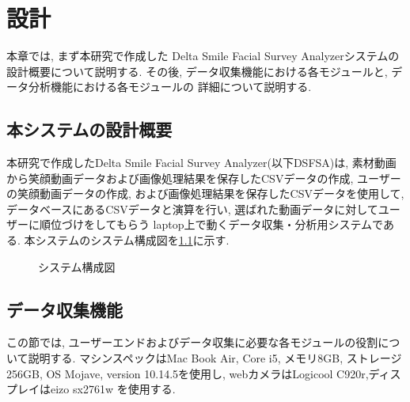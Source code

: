 \chapter{設計}
\label{chap:function}

本章では, まず本研究で作成した Delta Smile Facial Survey Analyzerシステムの
設計概要について説明する.
その後, データ収集機能における各モジュールと, データ分析機能における各モジュールの
詳細について説明する.

\section{本システムの設計概要}
本研究で作成したDelta Smile Facial Survey Analyzer(以下DSFSA)は,
素材動画から笑顔動画データおよび画像処理結果を保存したCSVデータの作成,
ユーザーの笑顔動画データの作成, および画像処理結果を保存したCSVデータを使用して,
データベースにあるCSVデータと演算を行い, 選ばれた動画データに対してユーザーに順位づけをしてもらう
laptop上で動くデータ収集・分析用システムである.
本システムのシステム構成図を\ref{fig:system_architecture}に示す.

\begin{figure}[htbp]
    \begin{center}
    \end{center}
    \caption{システム構成図}
    \label{fig:system_architecture}
\end{figure}

\section{データ収集機能}
この節では, ユーザーエンドおよびデータ収集に必要な各モジュールの役割について説明する.
マシンスペックはMac Book Air, Core i5, メモリ8GB, ストレージ256GB, OS Mojave, version 10.14.5を使用し,
webカメラはLogicool C920r,ディスプレイはeizo sx2761w を使用する.


